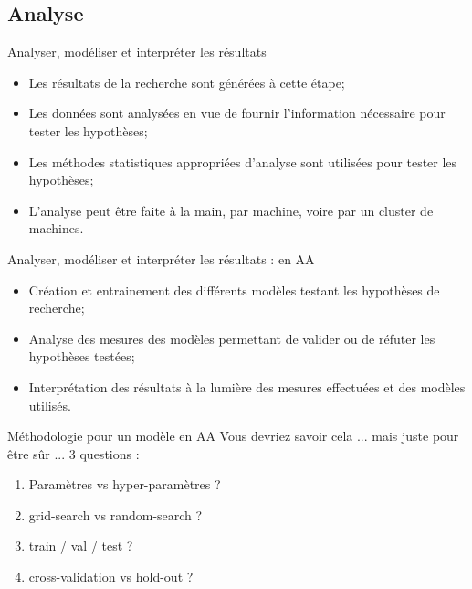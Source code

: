 \documentclass[french]{beamer}
\begin{document}
\subsection{Analyse}
\begin{frame}{Analyser, modéliser et interpréter les résultats}
	\begin{itemize}
		\item Les résultats de la recherche sont générées à cette étape;
		\item Les données sont analysées en vue de fournir l’information nécessaire pour tester les hypothèses;
		\item Les méthodes statistiques appropriées d’analyse sont utilisées pour tester les hypothèses;
		\item L’analyse peut être faite à la main, par machine,	voire par un cluster de machines.
	\end{itemize}
\end{frame}

\begin{frame}{Analyser, modéliser et interpréter les résultats : en AA}
\begin{itemize}
	\item Création et entrainement des différents modèles testant les hypothèses de recherche;
	\item Analyse des mesures des modèles permettant de valider ou de réfuter les hypothèses testées;
	\item Interprétation des résultats à la lumière des mesures effectuées et des modèles utilisés.
\end{itemize}
\end{frame}

\begin{frame}{Méthodologie pour un modèle en AA}
Vous devriez savoir cela ... mais juste pour être sûr ... 3 questions : 
\begin{enumerate}
	\item Paramètres vs hyper-paramètres ?
	\item grid-search vs random-search ?
	\item train / val / test ?
	\item cross-validation vs hold-out ?
\end{enumerate}
\end{frame}
\end{document}

